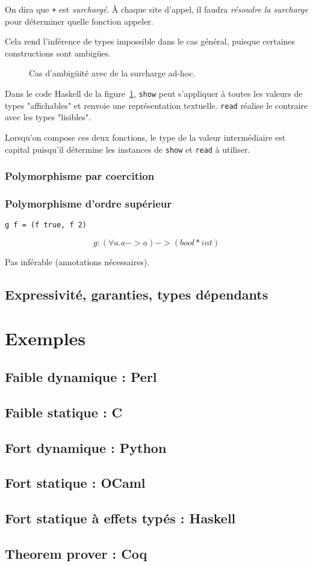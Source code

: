 On dira que \texttt{+} est \emph{surchargé}. À chaque site d'appel, il faudra
\emph{résoudre la surcharge} pour déterminer quelle fonction appeler.

Cela rend l'inférence de types 
impossible dans le cas général, puisque certaines constructions sont ambigües.

\begin{figure}
  \caption{Cas d'ambigüité avec de la surcharge ad-hoc.}
  \label{fig:showread}
\end{figure}

Dans le code Haskell de la figure~\ref{fig:showread}, \texttt{show} peut
s'appliquer à toutes les valeurs de types "affichables" et renvoie une
représentation textuelle. \texttt{read} réalise le contraire avec les types
"lisibles".

Lorsqu'on compose ces deux fonctions, le type de la valeur intermédiaire est
capital puisqu'il détermine les instances de \texttt{show} et \texttt{read} à
utiliser.

\subsubsection{Polymorphisme par coercition}

\subsubsection{Polymorphisme d'ordre supérieur}

\begin{verbatim}
g f = (f true, f 2)
\end{verbatim}

\[
g : (\forall a . a -> a) -> (bool * int)
\]

Pas inférable (annotations nécessaires).

\subsection{Expressivité, garanties, types dépendants}

\section{Exemples}

\subsection{Faible dynamique : Perl}
\subsection{Faible statique : C}
\subsection{Fort dynamique : Python}
\subsection{Fort statique : OCaml}
\subsection{Fort statique à effets typés : Haskell}
\subsection{Theorem prover : Coq}

